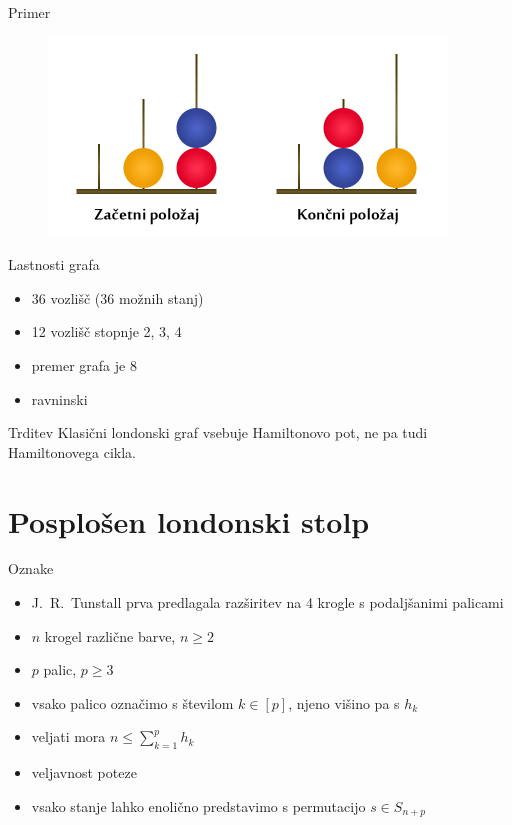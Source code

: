 \documentclass{beamer}
\begin{document}
\begin{frame}{Primer}
    \begin{figure}
        \centering
        \includegraphics[height=150pt]{../img/london-tower.png}
    \end{figure}
\end{frame}

\begin{frame}{Lastnosti grafa}
    \begin{itemize}
        \item 36 vozlišč (36 možnih stanj)
        \item 12 vozlišč stopnje 2, 3, 4
        \item premer grafa je 8
        \item ravninski
    \end{itemize}
   	\begin{block}{Trditev}
   		Klasični londonski graf vsebuje Hamiltonovo pot, ne pa tudi Hamiltonovega cikla.
   	\end{block}
\end{frame}

\section{Posplošen londonski stolp}
\begin{frame}{Oznake}
    \begin{itemize}
        \item J.\ R.\ Tunstall prva predlagala razširitev na 4 krogle s podaljšanimi palicami
        \item $n$ krogel različne barve, $n \geq 2$
        \item $p$ palic, $p \geq 3$
        \item vsako palico označimo s številom $k \in [p]$, njeno višino pa s $h_k$
        \item veljati mora $n \leq \sum_{k=1}^p h_k$
        \item veljavnost poteze
        \item vsako stanje lahko enolično predstavimo s permutacijo $s \in S_{n+p}$
    \end{itemize}
\end{frame}
\end{document}
